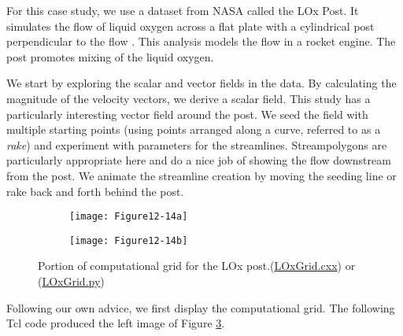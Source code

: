 For this case study, we use a dataset from NASA called the LOx Post.
It simulates the flow of liquid oxygen across a flat plate with a cylindrical post perpendicular to the flow \cite{Rogers86}.
This analysis models the flow in a rocket engine.
The post promotes mixing of the liquid oxygen.

We start by exploring the scalar and vector fields in the data. By calculating the magnitude of the velocity vectors, we derive a scalar field.
This study has a particularly interesting vector field around the post.
We seed the field with multiple starting points (using points arranged along a curve, referred to as a \emph{rake}) and experiment with parameters for the streamlines.
Streampolygons are particularly appropriate here and do a nice job of showing the flow downstream from the post.
We animate the streamline creation by moving the seeding line or rake back and forth behind the post.

\begin{figure}[htb]
	\begin{subfigure}[h]{0.48\linewidth}
		\texttt{[image: Figure12-14a]}
		\caption*{}
		\label{fig:Figure12-14a}
	\end{subfigure}
	\hfill
	\begin{subfigure}[h]{0.48\linewidth}
		\texttt{[image: Figure12-14b]}
		\caption*{}
		\label{fig:Figure12-14b}
	\end{subfigure}
	\caption{Portion of computational grid for the LOx post.(\href{https://lorensen.github.io/VTKExamples/site/Cxx/VisualizationAlgorithms/LOxGrid/}{LOxGrid.cxx}) or (\href{https://lorensen.github.io/VTKExamples/site/Python/VisualizationAlgorithms/LOxGrid/}{LOxGrid.py})}\label{fig:Figure12-14}
\end{figure}

Following our own advice, we first display the computational grid. The
following Tcl code produced the left image of Figure \ref{fig:Figure12-14}.

